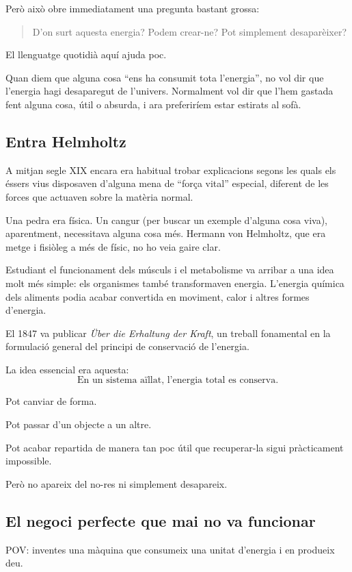 Però això obre immediatament una pregunta bastant grossa:
\begin{quote}
D'on surt aquesta energia? Podem crear-ne? Pot simplement desaparèixer?
\end{quote}
El llenguatge quotidià aquí ajuda poc.

Quan diem que alguna cosa ``ens ha consumit tota l'energia'', no vol dir que l'energia hagi desaparegut de l'univers. Normalment vol dir que l'hem gastada fent alguna cosa, útil o absurda, i ara preferiríem estar estirats al sofà.

\subsection{Entra Helmholtz}

A mitjan segle XIX encara era habitual trobar explicacions segons les quals els éssers vius disposaven d'alguna mena de ``força vital'' especial, diferent de les forces que actuaven sobre la matèria normal.

Una pedra era física. Un cangur (per buscar un exemple d’alguna cosa viva), aparentment, necessitava alguna cosa més. Hermann von Helmholtz, que era metge i fisiòleg a més de físic, no ho veia gaire clar.

Estudiant el funcionament dels músculs i el metabolisme va arribar a una idea molt més simple: els organismes també transformaven energia. L'energia química dels aliments podia acabar convertida en moviment, calor i altres formes d'energia.

El 1847 va publicar \textit{Über die Erhaltung der Kraft}, un treball fonamental en la formulació general del principi de conservació de l'energia.

La idea essencial era aquesta:
\[
\boxed{
\text{En un sistema aïllat, l'energia total es conserva.}
}
\]

Pot canviar de forma.

Pot passar d'un objecte a un altre.

Pot acabar repartida de manera tan poc útil que recuperar-la sigui pràcticament impossible.

Però no apareix del no-res ni simplement desapareix.

\subsection{El negoci perfecte que mai no va funcionar}

POV: inventes una màquina que consumeix una unitat d’energia i en produeix deu.

